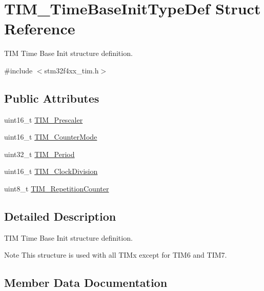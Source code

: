 \hypertarget{struct_t_i_m___time_base_init_type_def}{}\section{T\+I\+M\+\_\+\+Time\+Base\+Init\+Type\+Def Struct Reference}
\label{struct_t_i_m___time_base_init_type_def}


T\+IM Time Base Init structure definition.  




{\ttfamily \#include $<$stm32f4xx\+\_\+tim.\+h$>$}

\subsection*{Public Attributes}
\begin{DoxyCompactItemize}
\item 
uint16\+\_\+t \hyperlink{struct_t_i_m___time_base_init_type_def_a6d3c8632780db819b2eb811e71ce251e}{T\+I\+M\+\_\+\+Prescaler}
\item 
uint16\+\_\+t \hyperlink{struct_t_i_m___time_base_init_type_def_a0de4138cd939566bc667f21df089e195}{T\+I\+M\+\_\+\+Counter\+Mode}
\item 
uint32\+\_\+t \hyperlink{struct_t_i_m___time_base_init_type_def_a06a7f47b1ced6fa2227ec98a86eb391f}{T\+I\+M\+\_\+\+Period}
\item 
uint16\+\_\+t \hyperlink{struct_t_i_m___time_base_init_type_def_ab473f51adaa9474702e454fc8c24a407}{T\+I\+M\+\_\+\+Clock\+Division}
\item 
uint8\+\_\+t \hyperlink{struct_t_i_m___time_base_init_type_def_a81648259851390e090e1f507dfea7de8}{T\+I\+M\+\_\+\+Repetition\+Counter}
\end{DoxyCompactItemize}


\subsection{Detailed Description}
T\+IM Time Base Init structure definition. 

\begin{DoxyNote}{Note}
This structure is used with all T\+I\+Mx except for T\+I\+M6 and T\+I\+M7. 
\end{DoxyNote}


\subsection{Member Data Documentation}
